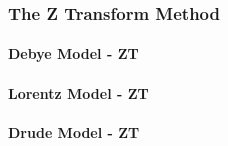 \subsubsection{The Z Transform Method}
\paragraph{\msjh Debye Model - ZT}

\paragraph{\msjh Lorentz Model - ZT}

\paragraph{\msjh Drude Model - ZT}

